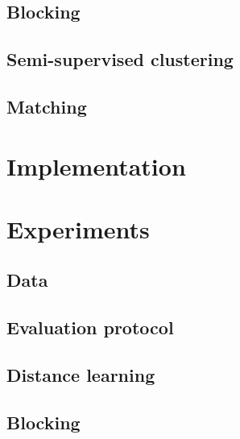 \documentclass{article}
\begin{document}
\subsection{Blocking}

\subsection{Semi-supervised clustering}

\subsection{Matching}



\section{Implementation}
\label{implementation}



\section{Experiments}
\label{experiments}

\subsection{Data}

\subsection{Evaluation protocol}

\subsection{Distance learning}

\subsection{Blocking}
\end{document}
